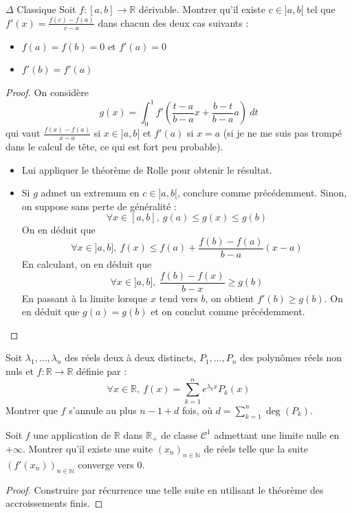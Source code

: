 \documentclass[french,a4paper]{article}
\newcommand{\N}{\mathbb{N}}
\newcommand{\R}{\mathbb{R}}
\theoremstyle{plain}
\theoremstyle{definition}
\theoremstyle{remark}
\begin{document}
\begin{ex}[Moulin.FV.04]{$\Delta$ Classique}
	Soit $f:[a,b]\to\R$ dérivable. Montrer qu'il existe $c\in]a,b[$ tel que $\displaystyle f'(x)=\frac{f(c)-f(a)}{c-a}$ dans chacun des deux cas suivants : 
	\begin{itemize}
		\item $f(a)=f(b)=0$ et $f'(a)=0$
		\item $f'(b)=f'(a)$
	\end{itemize}
\end{ex}
\begin{proof}
	On considère $$g(x)=\int_{0}^{1}f'\left(\frac{t-a}{b-a}x+\frac{b-t}{b-a}a\right)\ dt$$ qui vaut $\displaystyle\frac{f(x)-f(a)}{x-a}$ si $x\in]a,b]$ et $f'(a)$ si $x=a$ (si je ne me suis pas trompé dans le calcul de tête, ce qui est fort peu probable).
	\begin{itemize}
		\item Lui appliquer le théorème de Rolle pour obtenir le résultat.
		\item Si $g$ admet un extremum en $c\in]a,b[$, conclure comme précédemment. Sinon, on suppose sans perte de généralité : $$\forall x\in[a,b],\ g(a)\leqslant g(x)\leqslant g(b)$$ On en déduit que $$\forall x\in]a,b],\ f(x)\leqslant f(a)+\frac{f(b)-f(a)}{b-a}(x-a)$$ En calculant, on en déduit que $$\forall x\in]a,b],\ \frac{f(b)-f(x)}{b-x}\geqslant g(b)$$ En passant à la limite lorsque $x$ tend vers $b$, on obtient $f'(b)\geqslant g(b)$. On en déduit que $g(a)=g(b)$ et on conclut comme précédemment.
	\end{itemize}
\end{proof}

\begin{ex}[Moulin.FV.05]{}
	Soit $\lambda_1,\ldots,\lambda_n$ des réels deux à deux distincts, $P_1,\ldots,P_n$ des polynômes réels non nuls et $f:\R\to\R$ définie par : $$\forall x\in\R,\ f(x)=\sum_{k=1}^{n}e^{\lambda_k x}P_k(x)$$ Montrer que $f$ s'annule au plus $n-1+d$ fois, où $d=\displaystyle\sum_{k=1}^{n}\deg(P_k)$.
\end{ex}

\begin{ex}[Moulin.FV.06]{}
	Soit $f$ une application de $\R$ dans $\R_+$ de classe $\mathcal{C}^1$ admettant une limite nulle en $+\infty$. Montrer qu'il existe une suite $(x_n)_{n\in\N}$ de réels telle que la suite $(f'(x_n))_{n\in\N}$ converge vers $0$.
\end{ex}
\begin{proof}
	Construire par récurrence une telle suite en utilisant le théorème des accroissements finis.
\end{proof}
\end{document}
